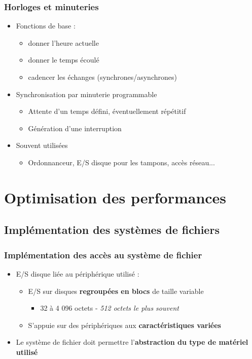 \begin{frame}
\frametitle{Horloges et minuteries}
\begin{itemize}
\item Fonctions de base :
\begin{itemize}
\item donner l'heure actuelle
\item donner le temps écoulé
\item cadencer les échanges (synchrones/asynchrones)
\end{itemize}
\item Synchronisation par minuterie programmable
\begin{itemize}
\item Attente d'un temps défini, éventuellement répétitif
\item Génération d'une interruption
\end{itemize}
\item Souvent utilisées
\begin{itemize}
\item Ordonnanceur, E/S disque pour les tampons, accès réseau...
\end{itemize}
\end{itemize}
\end{frame}


\section{Optimisation des performances}

\subsection{Implémentation des systèmes de fichiers}

\begin{frame}
\frametitle{Implémentation des accès au système de fichier}
\begin{itemize}
\item E/S disque liée au périphérique utilisé :
\begin{itemize}
\item E/S sur disques\textbf{ regroupées en blocs} de taille variable
\begin{itemize}
\item 32 à 4 096 octets - \textit{512 octets le plus souvent}
\end{itemize}
\item S'appuie sur des périphériques aux \textbf{caractéristiques variées}
\end{itemize}
\item Le système de fichier doit permettre l'\textbf{abstraction du type de matériel utilisé}
\end{itemize}
\end{frame}

